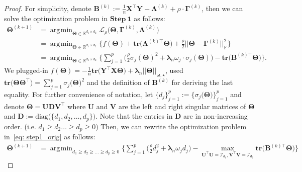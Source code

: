 \documentclass[alpha-refs]{wiley-article}
\DeclareMathOperator*{\argmin}{\arg\!\min}
\begin{document}
\begin{proof}
For simplicity, denote $\boldsymbol{B}^{(k)}:=\frac{1}{n}\boldsymbol{X}^{\top}\boldsymbol{Y}-\boldsymbol{\Lambda}^{(k)}+\rho \cdot \boldsymbol{\Gamma}^{(k)}$, then we can solve the optimization problem in $\textbf{Step}\ \boldsymbol{1}$ as follows:
\begin{align}
    \boldsymbol{\Theta}^{(k+1)} 
    &= \argmin_{\boldsymbol{\Theta}\in\mathbb{R}^{d_{1} \times d_{2}}} \mathcal{L}_{\rho} \big( \boldsymbol{\Theta},\boldsymbol{\Gamma}^{(k)},\boldsymbol{\Lambda}^{(k)} \big) \nonumber \\
    &= \argmin_{\boldsymbol{\Theta}\in\mathbb{R}^{d_{1} \times d_{2}}}  \bigg\{ f(\boldsymbol{\Theta}) + \textbf{tr}\big(\boldsymbol{\Lambda}^{(k) \top}\boldsymbol{\Theta}\big) + \frac{\rho}{2} || \boldsymbol{\Theta}-\boldsymbol{\Gamma}^{(k)} ||_{\text{F}}^{2} \bigg\}  \nonumber \\
    &= \argmin_{\boldsymbol{\Theta}\in\mathbb{R}^{d_{1} \times d_{2}}} \bigg\{ \sum_{j=1}^{p} \bigg( \frac{\rho}{2}\sigma_{j}(\boldsymbol{\Theta})^{2} + \boldsymbol{\lambda}_{n} \omega_{j} \cdot\sigma_{j}(\boldsymbol{\Theta}) \bigg) -\textbf{tr} \big( \boldsymbol{B}^{(k) \top}\boldsymbol{\Theta} \big) \bigg\} \label{eq: step1_orig}.
\end{align}
We plugged-in $f(\boldsymbol{\Theta})=-\frac{1}{n}\textbf{tr}\big( \boldsymbol{Y}^{\top}\boldsymbol{X}\boldsymbol{\Theta} \big)+\boldsymbol{\lambda}_{n}||\boldsymbol{\Theta}||_{\boldsymbol{\omega,\star}}$, 
used $\textbf{tr}\big(\boldsymbol{\Theta}\boldsymbol{\Theta}^{\top}\big)=\sum_{j=1}^{p}\sigma_{j}\big(\boldsymbol{\Theta}\big)^{2}$ and the definition of $\boldsymbol{B}^{(k)}$ for deriving the last equality.
For further convenience of notation, let $\{d_{j}\}_{j=1}^{p}:=\{\sigma_{j}\big(\boldsymbol{\Theta}\big)\}_{j=1}^{p}$ and 
denote $\boldsymbol{\Theta}=\boldsymbol{UDV^{\top}}$ where 
$\boldsymbol{U}$ and $\boldsymbol{V}$ are the left and right singular matrices of $\boldsymbol{\Theta}$ and $\boldsymbol{D}:=\text{diag}\big(\{d_{1},d_{2},\dots,d_{p}\}\big)$.
Note that the entries in $\boldsymbol{D}$ are in non-increasing order. (i.e. $d_{1} \geq d_{2} \dots \geq d_{p} \geq 0$)
Then, we can rewrite the optimization problem in~\eqref{eq: step1_orig} as follows:
\begin{align}
    \boldsymbol{\Theta}^{(k+1)} 
    &= \argmin_{d_{1}\geq d_{2}\geq \dots \geq d_{p} \geq 0 }\bigg\{ \sum_{j=1}^{p} \bigg( \frac{\rho}{2} d_{j}^{2} + \boldsymbol{\lambda}_{n}\omega_{j}d_{j} \bigg) - \max_{\boldsymbol{U}^{\top}\boldsymbol{U} = \mathcal{I}_{d_{1}}, \boldsymbol{V}^{\top}\boldsymbol{V} = \mathcal{I}_{d_{2}}} \textbf{tr}\big(\boldsymbol{B}^{(k)\top}\boldsymbol{\Theta}\big) \bigg\} \label{eq: step1_sec} 

\end{align}
\end{proof}
\end{document}
